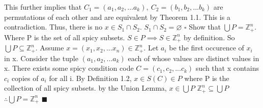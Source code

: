 \documentclass[12pt]{article}
\begin{document}
This further implies that \(C_1=(a_1,a_2,...a_k),\ C_2=(b_1,b_2,...b_k)\) are permutations of each other and are equivalent by Theorem 1.1.\newline
This is a contradiction. \newline
Thus, there is no \(x \in S_1\cap S_2\).
\newline
\(S_1\cap S_2 = \varnothing\)
\newline \(\square\) \newline
Show that \(\bigcup P =\mathbb{Z}_+^n\). Where P is the set of all spicy subsets.
\newline
\(S\in P \implies S \in \mathbb{Z}_+^n\) by definition. So \(\bigcup P \subseteq \mathbb{Z}_+^n\).
\newline
Assume \(x = (x_1,x_2,...x_n) \in \mathbb{Z}_+^n\).
\newline
Let \(a_i\) be the first occurence of \(x_i\) in x.
\newline
Consider the tuple \((a_1,a_2,...a_k)\) each of whose values are distinct values in x.
\newline
There exists some spicy condition code \(C=(c_1,c_2,...c_k)\) such that x contains \(c_i\) copies of \(a_i\) for all i.
\newline
By Definition 1.2, \(x \in S(C) \in P\) where P is the collection of all spicy subsets.
\newline
by the Union Lemma, \(x \in \bigcup P\)
\newline
\(\mathbb{Z}_+^n \subseteq \bigcup P\)
\newline
\(\therefore \bigcup P = \mathbb{Z}_+^n\)
\newline \(\blacksquare\)
\end{document}

